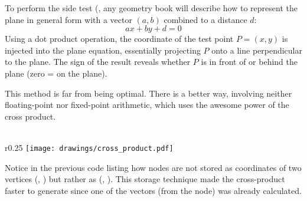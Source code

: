 To perform the side test (, any geometry book will describe how to represent the plane in general form with a vector $(a, b)$ combined to a distance $d$: $$ ax + by + d = 0 $$
Using a dot product operation, the coordinate of the test point $P=(x, y)$ is injected into the plane equation, essentially projecting $P$ onto a line perpendicular to the plane. The sign of the result reveals whether $P$ is in front of or behind the plane (zero = on the plane).\\
\par
This method is far from being optimal. There is a better way, involving neither floating-point nor fixed-point arithmetic, which uses the awesome power of the cross product.\\
\\
\par
\vspace{2mm}



\begin{wrapfigure}[8]{r}{0.25\textwidth}
\centering
\texttt{[image: drawings/cross\_product.pdf]}
\end{wrapfigure}
Notice in the previous code listing how nodes are not stored as coordinates of two vertices (, ) but rather as (, ). This storage technique made the cross-product faster to generate since one of the vectors (from the node) was already calculated.\par
\vspace{10pt}


